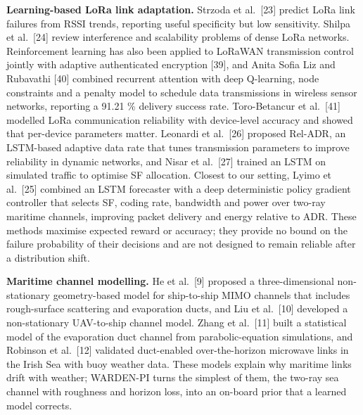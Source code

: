 \documentclass[
  11pt,
]{article}
\begin{document}
\textbf{Learning-based LoRa link adaptation.} Strzoda et al.~{[}23{]}
predict LoRa link failures from RSSI trends, reporting useful
specificity but low sensitivity. Shilpa et al.~{[}24{]} review
interference and scalability problems of dense LoRa networks.
Reinforcement learning has also been applied to LoRaWAN transmission
control jointly with adaptive authenticated encryption {[}39{]}, and
Anita Sofia Liz and Rubavathi {[}40{]} combined recurrent attention with
deep Q-learning, node constraints and a penalty model to schedule data
transmissions in wireless sensor networks, reporting a 91.21 \% delivery
success rate. Toro-Betancur et al.~{[}41{]} modelled LoRa communication
reliability with device-level accuracy and showed that per-device
parameters matter. Leonardi et al.~{[}26{]} proposed Rel-ADR, an
LSTM-based adaptive data rate that tunes transmission parameters to
improve reliability in dynamic networks, and Nisar et al.~{[}27{]}
trained an LSTM on simulated traffic to optimise SF allocation. Closest
to our setting, Lyimo et al.~{[}25{]} combined an LSTM forecaster with a
deep deterministic policy gradient controller that selects SF, coding
rate, bandwidth and power over two-ray maritime channels, improving
packet delivery and energy relative to ADR. These methods maximise
expected reward or accuracy; they provide no bound on the failure
probability of their decisions and are not designed to remain reliable
after a distribution shift.

\textbf{Maritime channel modelling.} He et al.~{[}9{]} proposed a
three-dimensional non-stationary geometry-based model for ship-to-ship
MIMO channels that includes rough-surface scattering and evaporation
ducts, and Liu et al.~{[}10{]} developed a non-stationary UAV-to-ship
channel model. Zhang et al.~{[}11{]} built a statistical model of the
evaporation duct channel from parabolic-equation simulations, and
Robinson et al.~{[}12{]} validated duct-enabled over-the-horizon
microwave links in the Irish Sea with buoy weather data. These models
explain why maritime links drift with weather; WARDEN-PI turns the
simplest of them, the two-ray sea channel with roughness and horizon
loss, into an on-board prior that a learned model corrects.
\end{document}
